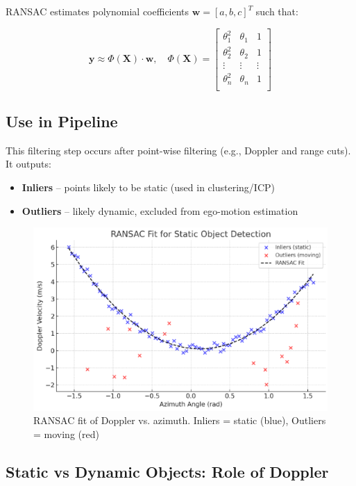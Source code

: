 RANSAC estimates polynomial coefficients $\mathbf{w} = [a, b, c]^T$ such that:

\[
\mathbf{y} \approx \Phi(\mathbf{X}) \cdot \mathbf{w}, \quad
\Phi(\mathbf{X}) = 
\begin{bmatrix}
\theta_1^2 & \theta_1 & 1 \\
\theta_2^2 & \theta_2 & 1 \\
\vdots & \vdots & \vdots \\
\theta_n^2 & \theta_n & 1 \\
\end{bmatrix}
\]

\subsection*{Use in Pipeline}

This filtering step occurs after point-wise filtering (e.g., Doppler and range cuts). It outputs:
\begin{itemize}
    \item \textbf{Inliers} – points likely to be static (used in clustering/ICP)
    \item \textbf{Outliers} – likely dynamic, excluded from ego-motion estimation
\end{itemize}

\begin{figure}[!htbp]
    \centering
    \includegraphics[width=1.0\linewidth]{images/RANSAC.png}
    \caption{RANSAC fit of Doppler vs. azimuth. Inliers = static (blue), Outliers = moving (red)}
    \label{fig:ransac_static_dynamic}
\end{figure}

\subsection{Static vs Dynamic Objects: Role of Doppler}

